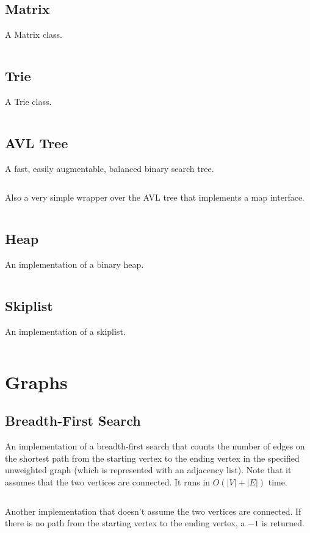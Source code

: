 \documentclass[9pt,a4paper]{amsart}
\newcommand{\code}[1]{\inputminted[linenos]{cpp}{_code/#1}}
\begin{document}
    \subsection{Matrix}
        A Matrix class.
        \code{data-structures/matrix.cpp}

    \subsection{Trie}
        A Trie class.
        \code{data-structures/trie.cpp}

    \subsection{AVL Tree}
        A fast, easily augmentable, balanced binary search tree.
        \code{data-structures/avl_tree.cpp}

        Also a very simple wrapper over the AVL tree that implements a map
        interface.
        \code{data-structures/avl_map.cpp}

    \subsection{Heap}
        An implementation of a binary heap.
        \code{data-structures/heap.cpp}

    \subsection{Skiplist}
        An implementation of a skiplist.
        \code{data-structures/skiplist.cpp}

\section{Graphs}
    \subsection{Breadth-First Search}
        An implementation of a breadth-first search that counts the number of
        edges on the shortest path from the starting vertex to the ending
        vertex in the specified unweighted graph (which is represented with an
        adjacency list). Note that it assumes that the two vertices are
        connected. It runs in $O(|V|+|E|)$ time.
        \code{graph/bfs.cpp}

        Another implementation that doesn't assume the two vertices are
        connected. If there is no path from the starting vertex to the ending
        vertex, a $-1$ is returned.
        \code{graph/bfs_visited.cpp}
\end{document}
